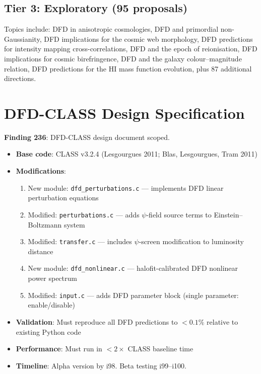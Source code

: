 \documentclass[11pt,a4paper]{article}
\begin{document}
\subsection{Tier 3: Exploratory (95 proposals)}

Topics include: DFD in anisotropic cosmologies, DFD and primordial non-Gaussianity, DFD implications for the cosmic web morphology, DFD predictions for intensity mapping cross-correlations, DFD and the epoch of reionisation, DFD implications for cosmic birefringence, DFD and the galaxy colour--magnitude relation, DFD predictions for the HI mass function evolution, plus 87 additional directions.

\section{DFD-CLASS Design Specification}

\textbf{Finding 236}: DFD-CLASS design document scoped.

\begin{tcolorbox}[colback=blue!5!white, colframe=dfdblue, title=\textbf{DFD-CLASS: Design Overview}]
\begin{itemize}[nosep]
\item \textbf{Base code}: CLASS v3.2.4 (Lesgourgues 2011; Blas, Lesgourgues, Tram 2011)
\item \textbf{Modifications}:
\begin{enumerate}[nosep]
\item New module: \texttt{dfd\_perturbations.c} --- implements DFD linear perturbation equations
\item Modified: \texttt{perturbations.c} --- adds $\psi$-field source terms to Einstein--Boltzmann system
\item Modified: \texttt{transfer.c} --- includes $\psi$-screen modification to luminosity distance
\item New module: \texttt{dfd\_nonlinear.c} --- halofit-calibrated DFD nonlinear power spectrum
\item Modified: \texttt{input.c} --- adds DFD parameter block (single parameter: enable/disable)
\end{enumerate}
\item \textbf{Validation}: Must reproduce all DFD predictions to $< 0.1\%$ relative to existing Python code
\item \textbf{Performance}: Must run in $< 2\times$ CLASS baseline time
\item \textbf{Timeline}: Alpha version by i98. Beta testing i99--i100.
\end{itemize}
\end{tcolorbox}
\end{document}
